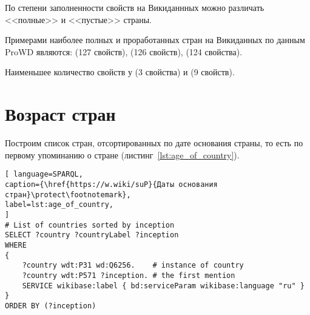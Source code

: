 По степени заполненности свойств на Викиданнных можно различать <<полные>> и  <<пустые>> страны. 

Примерами наиболее полных и проработанных стран на Викиданных по данным ProWD\cite{prowd_balakireva} являются:  (127 свойств),  (126 свойств),  (124 свойства).

Наименьшее количество свойств у  (3 свойства) и  (9 свойств).

\section{Возраст стран}


Построим список стран, отсортированных по дате основания страны, то есть по первому упоминанию о стране (листинг~\ref{lst:age_of_country}).

\begin{lstlisting}[ language=SPARQL, 
caption={\href{https://w.wiki/suP}{Даты основания стран}\protect\footnotemark},
label=lst:age_of_country, 
]
# List of countries sorted by inception 
SELECT ?country ?countryLabel ?inception
WHERE
{
	?country wdt:P31 wd:Q6256.    # instance of country
	?country wdt:P571 ?inception. # the first mention
	SERVICE wikibase:label { bd:serviceParam wikibase:language "ru" }
}
ORDER BY (?inception)
\end{lstlisting}


